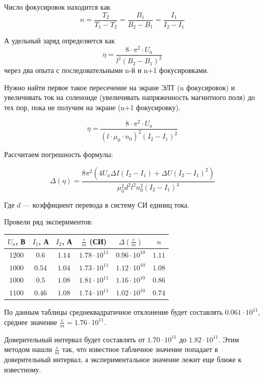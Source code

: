 Число фокусировок находится как $$n=\frac{T_2}{T_1-T_2}=\frac{B_1}{B_2-B_1}=\frac{I_1}{I_2-I_1}$$

А удельный заряд определяется как $$\eta=\frac{8\cdot\pi^2\cdot{}U_a}{l^2(B_2-B_1)^2}$$  через два опыта с последовательными n-й и n+1 фокусировками.

Нужно найти первое такое пересечение на экране ЭЛТ (n фокусировок) и увеличивать ток на соленоиде (увеличивать напряженность магнитного поля) до тех пор, пока не получим на экране (n+1 фокусировку).

$$\eta=\frac{8\cdot\pi^2\cdot{}U_a}{(l\cdot\mu_0\cdot{n_0})^2(I_2-I_1)^2}$$

Рассчитаем погрешность формулы:

$$\Delta{(\eta)}=\frac{8 \pi^{2} \left(4 U_{a} \Delta{I} \left(I_{2} - I_{1}\right) + \Delta{U} \left(I_{2} - I_{1}\right)^{2}\right)}{\mu_{0}^{2} d^{2} l^{2} n_{0}^{2} \left(I_{2} - I_{1}\right)^{4}}$$

Где $d$ --- коэффициент перевода в систему СИ единиц тока.

Провели ряд экспериментов: 

\begin{table}[h]
\begin{center}
\begin{tabular}{|c|c|c|c|c|c|}

\hline
$U_a$, В & $I_1$, А & $I_2$, А & $\frac{e}{m}$ (СИ) & $\Delta{(\frac{e}{m})}$ & $n$\\
\hline
$1200$ & $0.6$ & $1.14$ & $1.78\cdot10^{11}$ & $0.96\cdot10^{10}$  & $1.11$ \\ \hline
$1000$ & $0.54$ & $1.04$ & $1.73\cdot10^{11}$ & $1.12\cdot10^{10}$ & $1.08$ \\ \hline
$1000$ & $0.5$ & $1.08$ & $1.81\cdot10^{11}$ & $1.16\cdot10^{10}$  & $0.86$ \\ \hline
$1100$ & $0.46$ & $1.08$ & $1.74\cdot10^{11}$ & $1.02\cdot10^{10}$ & $0.74$ \\ \hline

\end{tabular}
\end{center}
\end{table} 


По данным таблицы среднеквадратичное отклонение будет составлять $0.061\cdot10^{11}$, среднее значение $\frac{e}{m}=1.76\cdot10^{11}$.

Доверительный интервал будет составлять от $1.70\cdot10^{11}$ до $1.82\cdot10^{11}$. Этим методом нашли $\frac{e}{m}$ так, что известное табличное значение попадает в доверительный интервал, а экспериментальное значение лежит еще ближе к известному.

